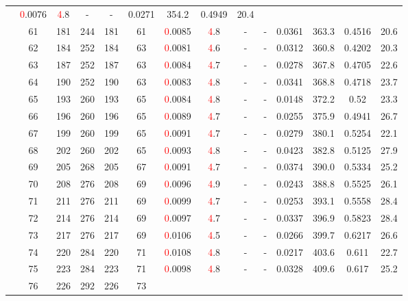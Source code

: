 \begin{table}[htb]
{\begin{tabular}{|c|c|c|c|c|c|c|c|c|c|c|c|c|c|}
 & \textcolor{red}0.0076 & \textcolor{red}4.8
 & - & -
 & 0.0271 & 354.2
 & 0.4949 & 20.4
 \\
 & 
61 & 181 & 244 & 181 & 61
 & \textcolor{red}0.0085 & \textcolor{red}4.8
 & - & -
 & 0.0361 & 363.3
 & 0.4516 & 20.6
 \\
 & 
62 & 184 & 252 & 184 & 63
 & \textcolor{red}0.0081 & \textcolor{red}4.6
 & - & -
 & 0.0312 & 360.8
 & 0.4202 & 20.3
 \\
 & 
63 & 187 & 252 & 187 & 63
 & \textcolor{red}0.0084 & \textcolor{red}4.7
 & - & -
 & 0.0278 & 367.8
 & 0.4705 & 22.6
 \\
 & 
64 & 190 & 252 & 190 & 63
 & \textcolor{red}0.0083 & \textcolor{red}4.8
 & - & -
 & 0.0341 & 368.8
 & 0.4718 & 23.7
 \\
 & 
65 & 193 & 260 & 193 & 65
 & \textcolor{red}0.0084 & \textcolor{red}4.8
 & - & -
 & 0.0148 & 372.2
 & 0.52 & 23.3
 \\
 & 
66 & 196 & 260 & 196 & 65
 & \textcolor{red}0.0089 & \textcolor{red}4.7
 & - & -
 & 0.0255 & 375.9
 & 0.4941 & 26.7
 \\
 & 
67 & 199 & 260 & 199 & 65
 & \textcolor{red}0.0091 & \textcolor{red}4.7
 & - & -
 & 0.0279 & 380.1
 & 0.5254 & 22.1
 \\
 & 
68 & 202 & 260 & 202 & 65
 & \textcolor{red}0.0093 & \textcolor{red}4.8
 & - & -
 & 0.0423 & 382.8
 & 0.5125 & 27.9
 \\
 & 
69 & 205 & 268 & 205 & 67
 & \textcolor{red}0.0091 & \textcolor{red}4.7
 & - & -
 & 0.0374 & 390.0
 & 0.5334 & 25.2
 \\
 & 
70 & 208 & 276 & 208 & 69
 & \textcolor{red}0.0096 & \textcolor{red}4.9
 & - & -
 & 0.0243 & 388.8
 & 0.5525 & 26.1
 \\
 & 
71 & 211 & 276 & 211 & 69
 & \textcolor{red}0.0099 & \textcolor{red}4.7
 & - & -
 & 0.0253 & 393.1
 & 0.5558 & 28.4
 \\
 & 
72 & 214 & 276 & 214 & 69
 & \textcolor{red}0.0097 & \textcolor{red}4.7
 & - & -
 & 0.0337 & 396.9
 & 0.5823 & 28.4
 \\
 & 
73 & 217 & 276 & 217 & 69
 & \textcolor{red}0.0106 & \textcolor{red}4.5
 & - & -
 & 0.0266 & 399.7
 & 0.6217 & 26.6
 \\
 & 
74 & 220 & 284 & 220 & 71
 & \textcolor{red}0.0108 & \textcolor{red}4.8
 & - & -
 & 0.0217 & 403.6
 & 0.611 & 22.7
 \\
 & 
75 & 223 & 284 & 223 & 71
 & \textcolor{red}0.0098 & \textcolor{red}4.8
 & - & -
 & 0.0328 & 409.6
 & 0.617 & 25.2
 \\
 & 
76 & 226 & 292 & 226 & 73

\end{tabular}}
\end{table}
